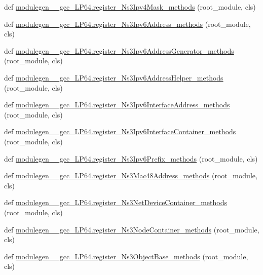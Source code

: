 \begin{DoxyCompactItemize}
\item 
def \hyperlink{namespacemodulegen____gcc__LP64_abfab99a01a92901ea710a50ce313c67c}{modulegen\+\_\+\+\_\+gcc\+\_\+\+L\+P64.\+register\+\_\+\+Ns3\+Ipv4\+Mask\+\_\+methods} (root\+\_\+module, cls)
\item 
def \hyperlink{namespacemodulegen____gcc__LP64_adadace4a2a2a7b40dbbc479c719515d9}{modulegen\+\_\+\+\_\+gcc\+\_\+\+L\+P64.\+register\+\_\+\+Ns3\+Ipv6\+Address\+\_\+methods} (root\+\_\+module, cls)
\item 
def \hyperlink{namespacemodulegen____gcc__LP64_a522d359d263718e49450e41d086d4ce6}{modulegen\+\_\+\+\_\+gcc\+\_\+\+L\+P64.\+register\+\_\+\+Ns3\+Ipv6\+Address\+Generator\+\_\+methods} (root\+\_\+module, cls)
\item 
def \hyperlink{namespacemodulegen____gcc__LP64_a7616eb7d9b7383a0dd57ca6840c2926c}{modulegen\+\_\+\+\_\+gcc\+\_\+\+L\+P64.\+register\+\_\+\+Ns3\+Ipv6\+Address\+Helper\+\_\+methods} (root\+\_\+module, cls)
\item 
def \hyperlink{namespacemodulegen____gcc__LP64_a9ad50c1571449da998bf2d678bdac8b9}{modulegen\+\_\+\+\_\+gcc\+\_\+\+L\+P64.\+register\+\_\+\+Ns3\+Ipv6\+Interface\+Address\+\_\+methods} (root\+\_\+module, cls)
\item 
def \hyperlink{namespacemodulegen____gcc__LP64_a180026d79fa81ac2c03def7a7296f2bb}{modulegen\+\_\+\+\_\+gcc\+\_\+\+L\+P64.\+register\+\_\+\+Ns3\+Ipv6\+Interface\+Container\+\_\+methods} (root\+\_\+module, cls)
\item 
def \hyperlink{namespacemodulegen____gcc__LP64_aabc084fc7c70fffda3389dc15cd95031}{modulegen\+\_\+\+\_\+gcc\+\_\+\+L\+P64.\+register\+\_\+\+Ns3\+Ipv6\+Prefix\+\_\+methods} (root\+\_\+module, cls)
\item 
def \hyperlink{namespacemodulegen____gcc__LP64_aa406a8e967bb0e5456a51fcef1ec276b}{modulegen\+\_\+\+\_\+gcc\+\_\+\+L\+P64.\+register\+\_\+\+Ns3\+Mac48\+Address\+\_\+methods} (root\+\_\+module, cls)
\item 
def \hyperlink{namespacemodulegen____gcc__LP64_a43937d11569618c76bf10e334e87f976}{modulegen\+\_\+\+\_\+gcc\+\_\+\+L\+P64.\+register\+\_\+\+Ns3\+Net\+Device\+Container\+\_\+methods} (root\+\_\+module, cls)
\item 
def \hyperlink{namespacemodulegen____gcc__LP64_afc1115291cc5820268d802870956928d}{modulegen\+\_\+\+\_\+gcc\+\_\+\+L\+P64.\+register\+\_\+\+Ns3\+Node\+Container\+\_\+methods} (root\+\_\+module, cls)
\item 
def \hyperlink{namespacemodulegen____gcc__LP64_a811b76d9911bfa2ed025b14b9a8aeb50}{modulegen\+\_\+\+\_\+gcc\+\_\+\+L\+P64.\+register\+\_\+\+Ns3\+Object\+Base\+\_\+methods} (root\+\_\+module, cls)

\end{DoxyCompactItemize}
